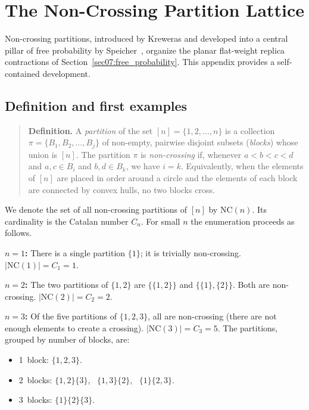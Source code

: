 \documentclass[11pt,letterpaper]{article}
\theoremstyle{plain}
\theoremstyle{definition}
\theoremstyle{remark}
\begin{document}
\section{The Non-Crossing Partition Lattice}
\label{app:nc_partitions}

Non-crossing partitions, introduced by Kreweras \cite{kreweras1972} and
developed into a central pillar of free probability by
Speicher~\cite{speicher1994,speicher1997}, organize the planar flat-weight
replica contractions of Section~\ref{sec07:free_probability}.  This appendix provides a
self-contained development.

\subsection{Definition and first examples}

\begin{quote}
\textbf{Definition.}
A \emph{partition} of the set $[n] = \{1,2,\dots,n\}$ is a collection
$\pi = \{B_1, B_2, \dots, B_j\}$ of non-empty, pairwise disjoint subsets
(\emph{blocks}) whose union is $[n]$.  The partition $\pi$ is
\emph{non-crossing} if, whenever $a < b < c < d$ and $a,c \in B_i$ and
$b,d \in B_k$, we have $i = k$.  Equivalently, when the elements of $[n]$ are
placed in order around a circle and the elements of each block are connected by
convex hulls, no two blocks cross.
\end{quote}

We denote the set of all non-crossing partitions of $[n]$ by $\mathrm{NC}(n)$.
Its cardinality is the Catalan number $C_n$.  For small $n$ the enumeration
proceeds as follows.

\medskip
\noindent
\textbf{$n=1$:}  There is a single partition $\{1\}$; it is trivially
non-crossing.  $|\mathrm{NC}(1)| = C_1 = 1$.

\medskip
\noindent
\textbf{$n=2$:}  The two partitions of $\{1,2\}$ are $\bigl\{\{1,2\}\bigr\}$
and $\bigl\{\{1\},\{2\}\bigr\}$.  Both are non-crossing.
$|\mathrm{NC}(2)| = C_2 = 2$.

\medskip
\noindent
\textbf{$n=3$:}  Of the five partitions of $\{1,2,3\}$, all are non-crossing
(there are not enough elements to create a crossing).
$|\mathrm{NC}(3)| = C_3 = 5$.  The partitions, grouped by number of blocks, are:
\begin{itemize}
  \item 1~block:  $\{1,2,3\}$.
  \item 2~blocks: $\{1,2\}\{3\}$, \ $\{1,3\}\{2\}$, \ $\{1\}\{2,3\}$.
  \item 3~blocks: $\{1\}\{2\}\{3\}$.
\end{itemize}
\end{document}
